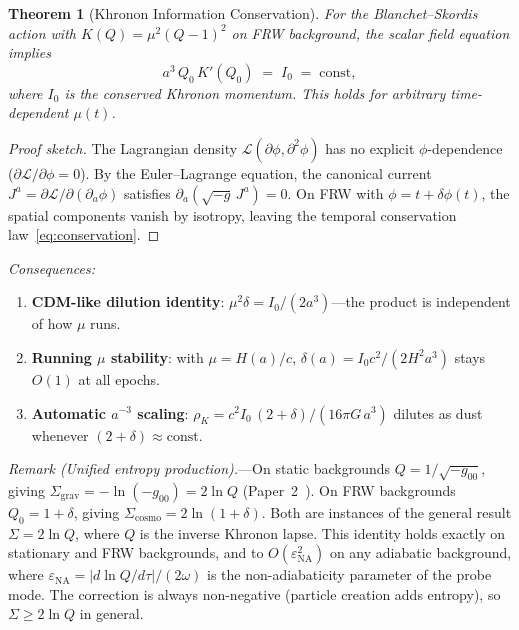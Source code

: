 \documentclass[prd,twocolumn,superscriptaddress,longbibliography,floatfix]{revtex4-2}
\newtheorem{theorem}{Theorem}
\begin{document}
\begin{theorem}[Khronon Information Conservation]
\label{thm:conservation}
For the Blanchet--Skordis action with $K(Q) = \mu^2(Q-1)^2$ on
FRW background, the scalar field equation implies
\begin{equation}
a^3\,Q_0\,K'(Q_0) \;=\; I_0 \;=\; \mathrm{const},
\label{eq:conservation}
\end{equation}
where $I_0$ is the conserved Khronon momentum.
This holds for arbitrary time-dependent $\mu(t)$.
\end{theorem}
\begin{proof}[Proof sketch]
The Lagrangian density $\mathcal{L}(\partial\phi,\partial^2\phi)$
has no explicit $\phi$-dependence
($\partial\mathcal{L}/\partial\phi = 0$).  By the Euler--Lagrange
equation, the canonical current
$J^a = \partial\mathcal{L}/\partial(\partial_a\phi)$ satisfies
$\partial_a(\sqrt{-g}\,J^a) = 0$.  On FRW with $\phi = t + \delta\phi(t)$,
the spatial components vanish by isotropy, leaving the temporal
conservation law~\eqref{eq:conservation}.
\end{proof}
\noindent\textit{Consequences:}
\begin{enumerate}
\item \textbf{CDM-like dilution identity}:
  $\mu^2\delta = I_0/(2a^3)$---the product is independent of
  how $\mu$ runs.
\item \textbf{Running $\mu$ stability}: with $\mu = H(a)/c$,
  $\delta(a) = I_0 c^2/(2H^2 a^3)$ stays $O(1)$ at all epochs.
\item \textbf{Automatic $a^{-3}$ scaling}:
  $\rho_K = c^2 I_0\,(2{+}\delta)/(16\pi G\,a^3)$ dilutes as
  dust whenever $(2{+}\delta) \approx \mathrm{const}$.
\end{enumerate}

\noindent\textit{Remark (Unified entropy production).}---On
static backgrounds $Q = 1/\sqrt{-g_{00}}$, giving
$\Sigma_{\mathrm{grav}} = -\ln(-g_{00}) = 2\ln Q$
(Paper~2~\cite{Paper2}).  On FRW backgrounds $Q_0 = 1 + \delta$,
giving $\Sigma_{\mathrm{cosmo}} = 2\ln(1+\delta)$.
Both are instances of the general result
$\Sigma = 2\ln Q$, where $Q$ is the inverse Khronon lapse.
This identity holds exactly on stationary and FRW backgrounds,
and to $O(\varepsilon_{\mathrm{NA}}^2)$ on any adiabatic
background, where
$\varepsilon_{\mathrm{NA}} = |d\ln Q/d\tau|/(2\omega)$
is the non-adiabaticity parameter of the probe mode.
The correction is always non-negative (particle creation adds
entropy), so $\Sigma \geq 2\ln Q$ in general.
\end{document}
